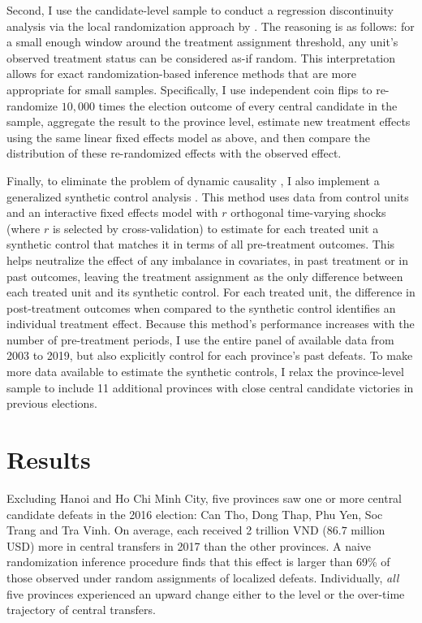 \documentclass[12pt]{article}
\newcommand{\1}{\mathbbm{1}}
\begin{document}
Second, I use the candidate-level sample to conduct a regression discontinuity analysis via the local randomization approach by \citet{CattaneoTitiunik2015}. The reasoning is as follows: for a small enough window around the treatment assignment threshold, any unit's observed treatment status can be considered as-if random. This interpretation allows for exact randomization-based inference methods that are more appropriate for small samples. Specifically, I use independent coin flips to re-randomize $10,000$ times the election outcome of every central candidate in the sample, aggregate the result to the province level, estimate new treatment effects using the same linear fixed effects model as above, and then compare the distribution of these re-randomized effects with the observed effect.

Finally, to eliminate the problem of dynamic causality \citep{ImaiKim2019}, 
I also implement a generalized synthetic control analysis \citep{Xu2017gsynth}. This method uses data from control units and an interactive fixed effects model with $r$ orthogonal time-varying shocks (where $r$ is selected by cross-validation) to estimate for each treated unit a synthetic control that matches it in terms of all pre-treatment outcomes. This helps neutralize the effect of any imbalance in covariates, in past treatment or in past outcomes, leaving the treatment assignment as the only difference between each treated unit and its synthetic control. For each treated unit, the difference in post-treatment outcomes when compared to the synthetic control identifies an individual treatment effect. Because this method's performance increases with the number of pre-treatment periods, I use the entire panel of available data from 2003 to 2019, but also explicitly control for each province's past defeats. To make more data available to estimate the synthetic controls, I relax the province-level sample to include 11 additional provinces with close central candidate victories in previous elections.

\section*{Results}
\label{sec:results}

Excluding Hanoi and Ho Chi Minh City, five provinces saw one or more central candidate defeats in the 2016 election: Can Tho, Dong Thap, Phu Yen, Soc Trang and Tra Vinh. On average, each received 2 trillion VND ($86.7$ million USD) more in central transfers in 2017 than the other provinces. A naive randomization inference procedure finds that this effect is larger than 69\% of those observed under random assignments of localized defeats. Individually, \textit{all} five provinces experienced an upward change either to the level or the over-time trajectory of central transfers.
\end{document}
